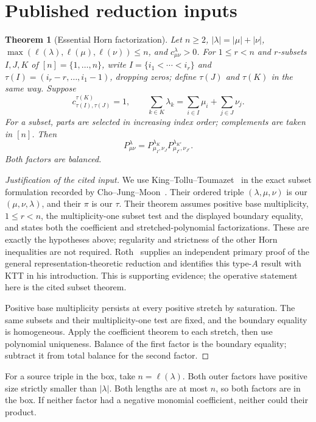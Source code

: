 \documentclass[11pt]{article}
\newtheorem{theorem}{Theorem}
\begin{document}
\section{Published reduction inputs}
\begin{theorem}[Essential Horn factorization]\label{thm:horn}
Let $n\ge2$, $|\lambda|=|\mu|+|\nu|$,
$\max(\ell(\lambda),\ell(\mu),\ell(\nu))\le n$, and
$c^\lambda_{\mu\nu}>0$.
For $1\le r<n$ and $r$-subsets $I,J,K$ of $[n]=\{1,\ldots,n\}$,
write $I=\{i_1<\cdots<i_r\}$ and
$\tau(I)=(i_r-r,\ldots,i_1-1)$, dropping zeros; define $\tau(J)$ and
$\tau(K)$ in the same way. Suppose
\[
 c^{\tau(K)}_{\tau(I),\tau(J)}=1,\qquad
 \sum_{k\in K}\lambda_k=\sum_{i\in I}\mu_i+\sum_{j\in J}\nu_j.
\]
For a subset, parts are selected in increasing index order; complements
are taken in $[n]$. Then
\[
 P^\lambda_{\mu\nu}
 =P^{\lambda_K}_{\mu_I,\nu_J}
  P^{\lambda_{K^c}}_{\mu_{I^c},\nu_{J^c}}.
\]
Both factors are balanced.
\end{theorem}
\begin{proof}[Justification of the cited input]
We use King--Tollu--Toumazet~\cite[Theorem 1.4]{KTT09} in the exact
subset formulation recorded by Cho--Jung--Moon~\cite[Definition 1.2
and Theorem 1.3]{CJMfpsac}. Their ordered triple $(\lambda,\mu,\nu)$
is our $(\mu,\nu,\lambda)$, and their $\pi$ is our $\tau$.
Their theorem assumes positive base multiplicity, $1\le r<n$,
the multiplicity-one subset test and the displayed boundary equality,
and states both the coefficient and stretched-polynomial factorizations.
These are exactly the hypotheses above; regularity and strictness of
the other Horn inequalities are not required.
Roth~\cite[Reduction Theorem (3.1.1)]{Roth} supplies an independent
primary proof of the general representation-theoretic reduction and
identifies this type-$A$ result with KTT in his introduction. This is
supporting evidence; the operative statement here is the cited subset theorem.

Positive base multiplicity persists at every positive stretch by
saturation. The same subsets and their multiplicity-one test are fixed,
and the boundary equality is homogeneous. Apply the coefficient theorem
to each stretch, then use polynomial uniqueness. Balance of the first
factor is the boundary equality; subtract it from total balance for the
second factor.
\end{proof}
For a source triple in the box, take $n=\ell(\lambda)$.
Both outer factors have positive size strictly
smaller than $|\lambda|$. Both lengths are at most $n$, so both factors
are in the box. If neither factor had a negative monomial coefficient,
neither could their product.
\end{document}
